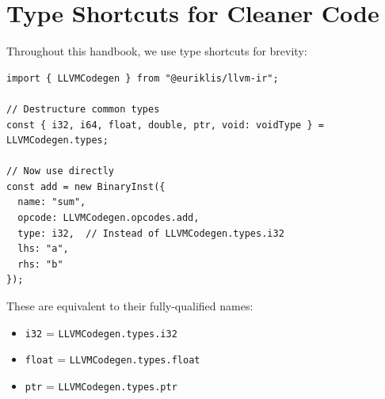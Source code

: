 \section{Type Shortcuts for Cleaner Code}

Throughout this handbook, we use type shortcuts for brevity:

\begin{lstlisting}[style=ts]
import { LLVMCodegen } from "@euriklis/llvm-ir";

// Destructure common types
const { i32, i64, float, double, ptr, void: voidType } = LLVMCodegen.types;

// Now use directly
const add = new BinaryInst({
  name: "sum",
  opcode: LLVMCodegen.opcodes.add,
  type: i32,  // Instead of LLVMCodegen.types.i32
  lhs: "a",
  rhs: "b"
});
\end{lstlisting}

These are equivalent to their fully-qualified names:
\begin{itemize}[noitemsep]
  \item \texttt{i32} = \texttt{LLVMCodegen.types.i32}
  \item \texttt{float} = \texttt{LLVMCodegen.types.float}
  \item \texttt{ptr} = \texttt{LLVMCodegen.types.ptr}
\end{itemize}

